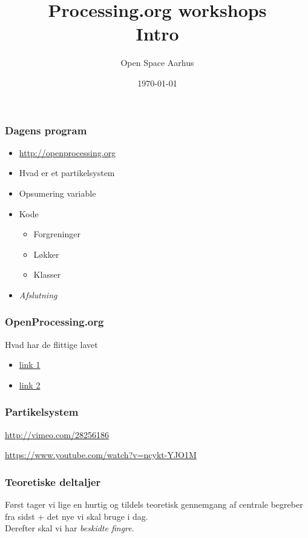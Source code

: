 \documentclass{beamer}
\title{Processing.org workshops\\Intro}
\author{Open Space Aarhus}
\date{\today}
\institute[Bryggervej 30]{Bryggervej 30, 8240 Århus N}
\begin{document}
\begin{frame}[label=titlepage]
  \titlepage
\end{frame}

\begin{frame}
  \frametitle{Dagens program}
  \begin{itemize}
  \item \url{http://openprocessing.org}
  \item Hvad er et partikelsystem
  \item Opsumering variable
  \item Kode
    \begin{itemize}
    \item Forgreninger
    \item Løkker
    \item Klasser
    \end{itemize}

  \item \emph{Afslutning}
    
  \end{itemize}						
\end{frame}


\begin{frame}
  \frametitle{OpenProcessing.org}
  \begin{block}{Hvad har de flittige lavet}
    \begin{itemize}
    \item \url{link 1}
    \item \url{link 2}
    \end{itemize}
  \end{block}
\end{frame}



\begin{frame}
  \frametitle{Partikelsystem}

  \url{http://vimeo.com/28256186}  

  \url{https://www.youtube.com/watch?v=ncykt-YJO1M}
\end{frame}


\begin{frame}
  \frametitle{Teoretiske deltaljer}
  
  Først tager vi lige en hurtig og tildels teoretisk gennemgang af
  centrale begreber fra sidst + det nye vi skal bruge i dag. \\
\vspace{2cm}
  Derefter skal vi har \emph{beskidte fingre}.
\end{frame}
\end{document}
